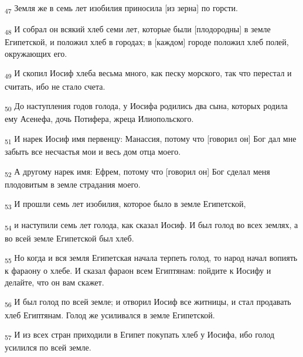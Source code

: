 \begin{tcolorbox}
\textsubscript{47} Земля же в семь лет изобилия приносила [из зерна] по горсти.
\end{tcolorbox}
\begin{tcolorbox}
\textsubscript{48} И собрал он всякий хлеб семи лет, которые были [плодородны] в земле Египетской, и положил хлеб в городах; в [каждом] городе положил хлеб полей, окружающих его.
\end{tcolorbox}
\begin{tcolorbox}
\textsubscript{49} И скопил Иосиф хлеба весьма много, как песку морского, так что перестал и считать, ибо не стало счета.
\end{tcolorbox}
\begin{tcolorbox}
\textsubscript{50} До наступления годов голода, у Иосифа родились два сына, которых родила ему Асенефа, дочь Потифера, жреца Илиопольского.
\end{tcolorbox}
\begin{tcolorbox}
\textsubscript{51} И нарек Иосиф имя первенцу: Манассия, потому что [говорил он] Бог дал мне забыть все несчастья мои и весь дом отца моего.
\end{tcolorbox}
\begin{tcolorbox}
\textsubscript{52} А другому нарек имя: Ефрем, потому что [говорил он] Бог сделал меня плодовитым в земле страдания моего.
\end{tcolorbox}
\begin{tcolorbox}
\textsubscript{53} И прошли семь лет изобилия, которое было в земле Египетской,
\end{tcolorbox}
\begin{tcolorbox}
\textsubscript{54} и наступили семь лет голода, как сказал Иосиф. И был голод во всех землях, а во всей земле Египетской был хлеб.
\end{tcolorbox}
\begin{tcolorbox}
\textsubscript{55} Но когда и вся земля Египетская начала терпеть голод, то народ начал вопиять к фараону о хлебе. И сказал фараон всем Египтянам: пойдите к Иосифу и делайте, что он вам скажет.
\end{tcolorbox}
\begin{tcolorbox}
\textsubscript{56} И был голод по всей земле; и отворил Иосиф все житницы, и стал продавать хлеб Египтянам. Голод же усиливался в земле Египетской.
\end{tcolorbox}
\begin{tcolorbox}
\textsubscript{57} И из всех стран приходили в Египет покупать хлеб у Иосифа, ибо голод усилился по всей земле.
\end{tcolorbox}
